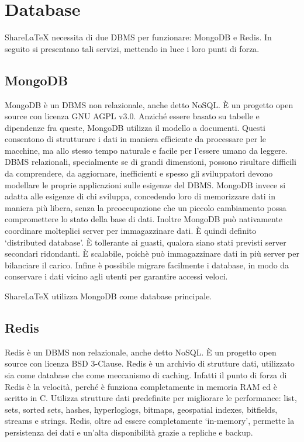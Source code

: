 \section{Database}
ShareLaTeX necessita di due DBMS per funzionare: MongoDB e Redis. In seguito si presentano tali servizi, mettendo in luce i loro punti di forza.

\subsection{MongoDB}
MongoDB è un DBMS non relazionale, anche detto NoSQL. È un progetto open source con licenza GNU AGPL v3.0. Anziché essere basato su tabelle e dipendenze fra queste, MongoDB utilizza il modello a documenti. Questi consentono di strutturare i dati in maniera efficiente da processare per le macchine, ma allo stesso tempo naturale e facile per l'essere umano da leggere. DBMS relazionali, specialmente se di grandi dimensioni, possono risultare difficili da comprendere, da aggiornare, inefficienti e spesso gli sviluppatori devono modellare le proprie applicazioni sulle esigenze del DBMS. MongoDB invece si adatta alle esigenze di chi sviluppa, concedendo loro di memorizzare dati in maniera più libera, senza la preoccupazione che un piccolo cambiamento possa compromettere lo stato della base di dati. Inoltre MongoDB può nativamente coordinare molteplici server per immagazzinare dati. È quindi definito \enquote*{distributed database}. È tollerante ai guasti, qualora siano stati previsti server secondari ridondanti. È scalabile, poichè può immagazzinare dati in più server per bilanciare il carico. Infine è possibile migrare facilmente i database, in modo da conservare i dati vicino agli utenti per garantire accessi veloci.

ShareLaTeX utilizza MongoDB come database principale.

\subsection{Redis}
Redis è un DBMS non relazionale, anche detto NoSQL. È un progetto open source con licenza BSD 3-Clause. Redis è un archivio di strutture dati, utilizzato sia come database che come meccanismo di caching. Infatti il punto di forza di Redis è la velocità, perché è funziona completamente in memoria RAM ed è scritto in C. Utilizza strutture dati predefinite per migliorare le performance: list, sets, sorted sets, hashes, hyperloglogs, bitmaps, geospatial indexes, bitfields, streams e strings. Redis, oltre ad essere completamente \enquote*{in-memory}, permette la persistenza dei dati e un'alta disponibilità grazie a repliche e backup.

